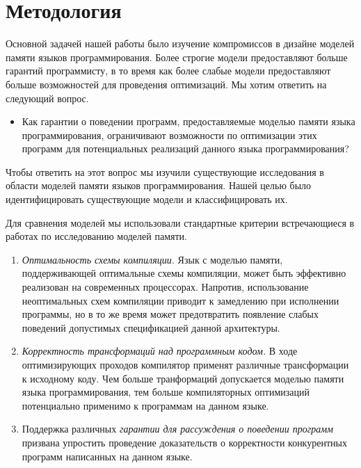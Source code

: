 \section{Методология}
\label{sec:methodology}

Основной задачей нашей работы было изучение
компромиссов в дизайне моделей памяти 
языков программирования. 
Более строгие модели предоставляют больше гарантий программисту,
в то время как более слабые модели предоставляют 
больше возможностей для проведения оптимизаций. 
Мы хотим ответить на следующий вопрос. 

\begin{itemize}
  \item Как гарантии о поведении программ, 
    предоставляемые моделью памяти языка программирования, 
    ограничивают возможности по оптимизации этих программ
    для потенциальных реализаций данного языка программирования?
\end{itemize}

Чтобы ответить на этот вопрос мы изучили существующие исследования 
в области моделей памяти языков программирования.
Нашей целью было идентифицировать существующие модели и классифицировать их.

Для сравнения моделей мы использовали стандартные критерии
встречающиеся в работах по исследованию моделей памяти. 

\begin{enumerate}[label=\textbf{C.\arabic*}]
  
  \item \label{item:criteria:opt-comp}
    \emph{Оптимальность схемы компиляции.}
    Язык с моделью памяти, поддерживающей оптимальные 
    схемы компиляции, может быть эффективно реализован
    на современных процессорах. 
    Напротив, использование неоптимальных схем компиляции
    приводит к замедлению при исполнении программы, 
    но в то же время может предотвратить появление 
    слабых поведений допустимых спецификацией данной архитектуры. 

  \item \label{item:criteria:sound-trans}
    \emph{Корректность трансформаций над программным кодом.} 
    В ходе оптимизирующих проходов компилятор
    применят различные трансформации к исходному коду. 
    Чем больше транформаций допускается моделью памяти языка программирования, 
    тем больше компиляторных оптимизаций потенциально применимо 
    к программам на данном языке. 

  \item \label{item:criteria:reasoning}
    Поддержка различных \emph{гарантии для рассуждения о поведении программ}
    призвана упростить проведение доказательств о корректности 
    конкурентных программ написанных на данном языке. 
  
\end{enumerate}

